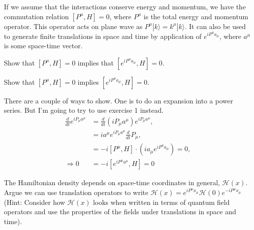 \documentclass[working, oneside]{../../Preambles/tuftebook}
\begin{document}
If we assume that the interactions conserve energy and momentum, we have the commutation relation \( [P^\mu, H] = 0 \), where \( P^\mu \) is the total energy and momentum operator. This operator acts on plane wave as \( P^\mu | k \rangle = k^\mu | k \rangle \). It can also be used to generate finite translations in space and time by application of \( e^{i P^\mu a_\mu} \), where \( a^\mu \) is some space-time vector.
\begin{exercise}[6]
Show that \( [P^\mu, H] = 0 \) implies that \( [e^{i P^\mu a_\mu}, H] = 0 \).
\end{exercise}
\begin{solution}
Show that \( [P^\mu, H] = 0 \) implies \( [e^{i P^\mu a_\mu}, H] = 0 \).

There are a couple of ways to show. One is to do an expansion into a power series. But I'm going to try to use exercise 1 instead.
\begin{align*}
\frac{d}{dt} e^{i P_\mu a^\mu}
&= \frac{d}{dt} (i P_\mu a^\mu) e^{i P_\mu a^\mu}, \\
&= i a^\mu e^{i P_\mu a^\mu} \frac{d}{dt} P_\mu, \\
&= -i [P^\mu, H] \cdot \left( ia_{\mu }e^{iP^{\mu }a_{\mu }} \right)  = 0, \\
\Rightarrow 0
&= -i [e^{i P^\mu a^\mu}, H] = 0
\end{align*}
\end{solution}
\begin{exercise}[7]
The Hamiltonian density depends on space-time coordinates in general, \( \mathcal{H}(x) \). Argue we can use translation operators to write \( \mathcal{H}(x) = e^{i P^\mu x_\mu} \mathcal{H}(0) e^{-i P^\mu x_\mu} \) (Hint: Consider how \( \mathcal{H}(x) \) looks when written in terms of quantum field operators and use the properties of the fields under translations in space and time).
\end{exercise}
\end{document}
